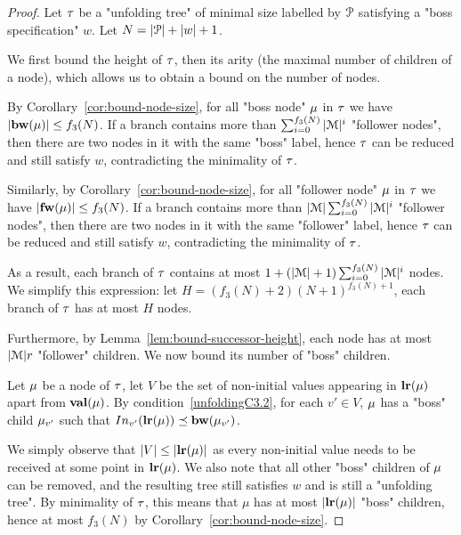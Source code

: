 \begin{proof}
	Let $\tau$ be a "unfolding tree" of minimal size labelled by $\mathcal{P}$ satisfying a "boss specification" $w$. Let $N = |\mathcal{P}| + |w|+1$.
	
	We first bound the height of $\tau$, then its arity (the maximal number of children of a node), which allows us to obtain a bound on the number of nodes.
	
	By Corollary~\ref{cor:bound-node-size}, for all "boss node" $\mu$ in $\tau$ we have $|\mathbf{bw}(\mu)| \leq f_3(N)$.
	If a branch contains more than $\sum_{i=0}^{f_3(N)}|\mathcal{M}|^{i}$ "follower nodes", then there are two nodes in it with the same "boss" label, hence $\tau$ can be reduced and still satisfy $w$, contradicting the minimality of $\tau$.
	
	Similarly, by Corollary~\ref{cor:bound-node-size}, for all "follower node" $\mu$ in $\tau$ we have $|\mathbf{fw}(\mu)| \leq f_3(N)$.
	If a branch contains more than $|\mathcal{M}|\sum_{i=0}^{f_3(N)}|\mathcal{M}|^{i}$ "follower nodes", then there are two nodes in it with the same "follower" label, hence $\tau$ can be reduced and still satisfy $w$, contradicting the minimality of $\tau$.
	
	As a result, each branch of $\tau$ contains at most $1+ (|\mathcal{M}|+1) \sum_{i=0}^{f_3(N)}|\mathcal{M}|^{i}$ nodes. We simplify this expression: let $H = (f_3(N)+2)(N+1)^{f_3(N)+1}$, each branch of $\tau$ has at most $H$ nodes.
	
	Furthermore, by Lemma~\ref{lem:bound-successor-height}, each node has at most $|\mathcal{M}|r$ "follower" children. We now bound its number of "boss" children.
	
	Let $\mu$ be a node of $\tau$, let $V$ be the set of non-initial values appearing in $\mathbf{lr}(\mu)$ apart from $\mathbf{val}(\mu)$.
	By condition~\ref{unfoldingC3.2}, for each $v' \in V$, $\mu$ has a "boss" child $\mu_{v'}$ such that $\vinput{v'}{\localrunlabel{\node}} \subword \bosslabel{\node_{v'}}$.
	
	We simply observe that $|V| \leq |\mathbf{lr}(\mu)|$ as every non-initial value needs to be received at some point in $\mathbf{lr}(\mu)$. We also note that all other "boss" children of $\mu$ can be removed, and the resulting tree still satisfies $w$ and is still a "unfolding tree". By minimality of $\tau$, this means that $\mu$ has at most $|\mathbf{lr}(\mu)|$ "boss" children, hence at most $f_3(N)$ by Corollary~\ref{cor:bound-node-size}.
	

\end{proof}
